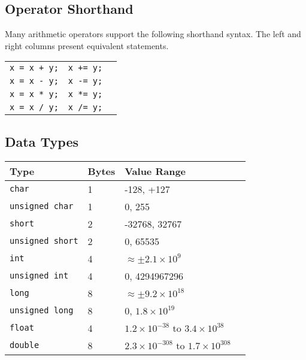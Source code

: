 \documentclass{lab}
\begin{document}
\begin{multicols}{2}
\columnbreak
\subsection{Operator Shorthand}

Many arithmetic operators support the following shorthand syntax. The left and right columns present equivalent statements.

\begin{table}[H]
\centering
\begin{tabular}{|c|c|c|}
\hline
\texttt{x = x + y;} & \texttt{x += y;} \\
\texttt{x = x - y;} & \texttt{x -= y;} \\
\texttt{x = x * y;} & \texttt{x *= y;} \\
\texttt{x = x / y;} & \texttt{x /= y;} \\
\hline
\end{tabular}
\end{table}

\subsection{Data Types}

\begin{table}[H]
\begin{tabular}{|l|l|l|l|}
\hline
Type & Bytes & Value Range                             \\
\hline
\texttt{char}      & 1                  & -128, +127  \\
\texttt{unsigned char}	& 1				& 0, 255 \\
\texttt{short}     & 2                & -32768, 32767\\
\texttt{unsigned short} & 2			& 0, 65535 \\
\texttt{int}       & 4                & $\approx \pm 2.1\times 10^9$ \\
\texttt{unsigned int}	& 4				& 0, 4294967296 \\
\texttt{long}      & 8                  & $\approx \pm 9.2\times 10^{18}$ \\
\texttt{unsigned long} & 8				& 0, $1.8 \times 10^{19}$ \\
\texttt{float}       & 4  & $1.2\times 10^{-38}$ to $3.4 \times 10^{38}$    \\
\texttt{double}      & 8  & $2.3 \times 10^{-308}$ to $1.7 \times 10^{308}$    \\

\hline
\end{tabular}
\end{table}


\end{multicols}
\end{document}
